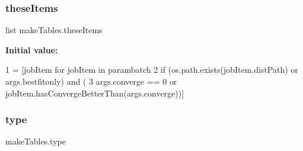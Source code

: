\mbox{\label{namespacemakeTables_a86cc3672f98bbfb5411b7d0fc643f57d}} 
\subsubsection{\texorpdfstring{these\+Items}{theseItems}}
{\footnotesize\ttfamily list make\+Tables.\+these\+Items}

{\bfseries Initial value\+:}
\begin{DoxyCode}
1 =  [jobItem \textcolor{keywordflow}{for} jobItem \textcolor{keywordflow}{in} parambatch
2                           \textcolor{keywordflow}{if} (os.path.exists(jobItem.distPath) \textcolor{keywordflow}{or} args.bestfitonly) \textcolor{keywordflow}{and} (
3                     args.converge == 0 \textcolor{keywordflow}{or} jobItem.hasConvergeBetterThan(args.converge))]
\end{DoxyCode}
\mbox{\label{namespacemakeTables_a4c68a93e87904d243720fd0eaf745cab}} 
\subsubsection{\texorpdfstring{type}{type}}
{\footnotesize\ttfamily make\+Tables.\+type}

